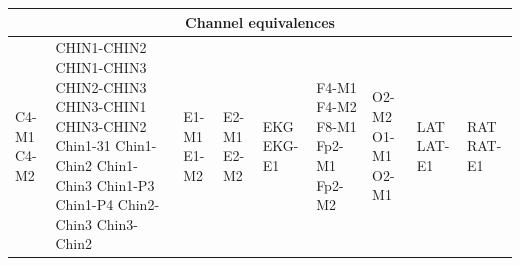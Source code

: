 \begin{minipage}{0.45\textwidth}
\begin{adjustbox}{angle=90}
\begin{tabular}{ |p{2cm}||p{3cm}||p{2cm}||p{2cm}||p{2cm}||p{2cm}||p{2cm}||p{2cm}||p{2cm}| }
 \hline
 \multicolumn{9}{|c|}{Channel equivalences} \\
 \hline
 C4-M1 \newline C4-M2 & CHIN1-CHIN2 \newline CHIN1-CHIN3 \newline CHIN2-CHIN3 \newline CHIN3-CHIN1 \newline CHIN3-CHIN2 \newline Chin1-31 \newline Chin1-Chin2 \newline Chin1-Chin3 \newline Chin1-P3 \newline Chin1-P4 \newline Chin2-Chin3 \newline Chin3-Chin2 & E1-M1 \newline E1-M2 & E2-M1 \newline E2-M2 & EKG \newline EKG-E1 & F4-M1 \newline F4-M2 \newline F8-M1 \newline Fp2-M1 \newline Fp2-M2 & O2-M2 \newline O1-M1 \newline O2-M1 & LAT \newline LAT-E1 & RAT \newline RAT-E1 \\ 
 \hline
\end{tabular}
\end{adjustbox}
\end{minipage}%
\hfill
